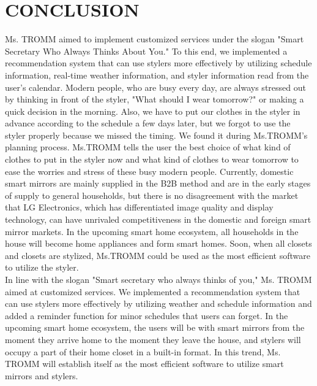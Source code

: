 \documentclass[conference]{IEEEtran}
\begin{document}
\section{CONCLUSION}
Ms. TROMM aimed to implement customized services under the slogan "Smart Secretary Who Always Thinks About You." To this end, we implemented a recommendation system that can use stylers more effectively by utilizing schedule information, real-time weather information, and styler information read from the user's calendar. Modern people, who are busy every day, are always stressed out by thinking in front of the styler, "What should I wear tomorrow?" or making a quick decision in the morning. Also, we have to put our clothes in the styler in advance according to the schedule a few days later, but we forgot to use the styler properly because we missed the timing. We found it during Ms.TROMM's planning process. Ms.TROMM tells the user the best choice of what kind of clothes to put in the styler now and what kind of clothes to wear tomorrow to ease the worries and stress of these busy modern people. Currently, domestic smart mirrors are mainly supplied in the B2B method and are in the early stages of supply to general households, but there is no disagreement with the market that LG Electronics, which has differentiated image quality and display technology, can have unrivaled competitiveness in the domestic and foreign smart mirror markets. In the upcoming smart home ecosystem, all households in the house will become home appliances and form smart homes. Soon, when all closets and closets are stylized, Ms.TROMM could be used as the most efficient software to utilize the styler.\\
In line with the slogan "Smart secretary who always thinks of you," Ms. TROMM aimed at customized services. We implemented a recommendation system that can use stylers more effectively by utilizing weather and schedule information and added a reminder function for minor schedules that users can forget. In the upcoming smart home ecosystem, the users will be with smart mirrors from the moment they arrive home to the moment they leave the house, and stylers will occupy a part of their home closet in a built-in format. In this trend, Ms. TROMM will establish itself as the most efficient software to utilize smart mirrors and stylers.
\end{document}

